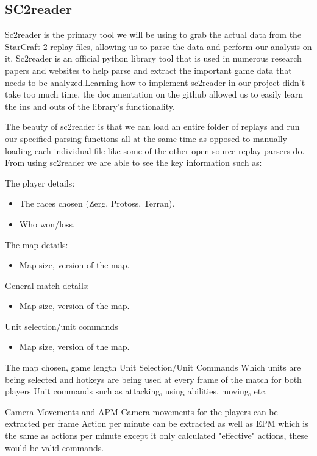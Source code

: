 \documentclass[a4paper,12pt]{report}
\begin{document}
\subsection{SC2reader}
Sc2reader is the primary tool we will be using to grab the actual data from the StarCraft 2 replay files, allowing us to parse the data and perform our analysis on it. Sc2reader is an official python library tool that is used in numerous research papers and websites to help parse and extract the important game data that needs to be analyzed.Learning how to implement sc2reader in our project didn’t take too much time, the documentation on the github allowed us to easily learn the ins and outs of the library's functionality.

The beauty of sc2reader is that we can load an entire folder of replays and run our specified parsing functions all at the same time as opposed to manually loading each individual file like some of the other open source replay parsers do.
From using sc2reader we are able to see the key information such as:

The player details:
\begin{itemize}[,]
    \setlength\itemsep{-.1cm}
    \item The races chosen (Zerg, Protoss, Terran).
    \item Who won/loss.
\end{itemize}
The map details:
\begin{itemize}[,]
    \setlength\itemsep{-.1cm}
    \item Map size, version of the map.
\end{itemize}
General match details:
\begin{itemize}[,]
    \setlength\itemsep{-.1cm}
    \item Map size, version of the map.
\end{itemize}
Unit selection/unit commands
\begin{itemize}[,]
    \setlength\itemsep{-.1cm}
    \item Map size, version of the map.
\end{itemize}


The map chosen, game length
Unit Selection/Unit Commands
Which units are being selected and hotkeys are being used at every frame of the match for both players
Unit commands such as attacking, using abilities, moving, etc.

Camera Movements and APM
 Camera movements for the players can be extracted per frame
Action per minute can be extracted as well as EPM which is the same as actions per minute except it only calculated "effective" actions, these would be valid commands.
\end{document}
